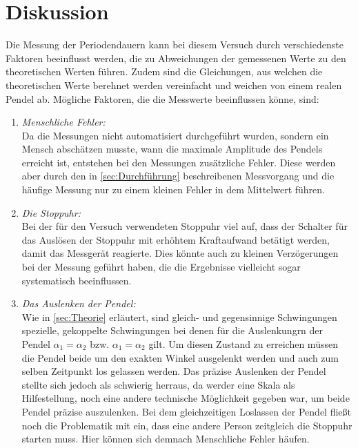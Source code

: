 \section{Diskussion}
\label{sec:Diskussion}

Die Messung der Periodendauern kann bei diesem Versuch durch verschiedenste Faktoren beeinflusst werden, die zu Abweichungen
der gemessenen Werte zu den theoretischen Werten führen. Zudem sind die Gleichungen, aus welchen die theoretischen Werte 
berehnet werden vereinfacht und weichen von einem realen Pendel ab. 
Mögliche Faktoren, die die Messwerte beeinflussen könne, sind:
\begin{enumerate}
    \item \textit{Menschliche Fehler:}\\
        Da die Messungen nicht automatisiert durchgeführt wurden, sondern ein Mensch abschätzen musste, wann die maximale 
        Amplitude des Pendels erreicht ist, entstehen bei den Messungen zusätzliche Fehler. Diese werden aber durch den in
        \ref{sec:Durchführung} beschreibenen Messvorgang und die häufige Messung nur zu einem kleinen Fehler in dem Mittelwert
        führen.
    \item \textit{Die Stoppuhr:}\\
        Bei der für den Versuch verwendeten Stoppuhr viel auf, dass der Schalter für das Auslösen der Stoppuhr mit erhöhtem 
        Kraftaufwand betätigt werden, damit das Messgerät reagierte. Dies könnte auch zu kleinen Verzögerungen bei der 
        Messung geführt haben, die die Ergebnisse vielleicht sogar systematisch beeinflussen.
    \item \textit{Das Auslenken der Pendel:}\\
        Wie in \ref{sec:Theorie} erläutert, sind gleich- und gegensinnige Schwingungen spezielle, gekoppelte Schwingungen bei 
        denen für die Auslenkungrn der Pendel $\alpha_1=\alpha_2$ bzw. $\alpha_1=\alpha_2$ gilt. Um diesen Zustand zu erreichen
        müssen die Pendel beide um den exakten Winkel ausgelenkt werden und auch zum selben Zeitpunkt los gelassen werden. Das 
        präzise Auslenken der Pendel stellte sich jedoch als schwierig herraus, da werder eine Skala als Hilfestellung, noch 
        eine andere technische Möglichkeit gegeben war, um beide Pendel präzise auszulenken. Bei dem gleichzeitigen Loslassen
        der Pendel fließt noch die Problematik mit ein, dass eine andere Person zeitgleich die Stoppuhr starten muss. Hier 
        können sich demnach Menschliche Fehler häufen.
\end{enumerate}
